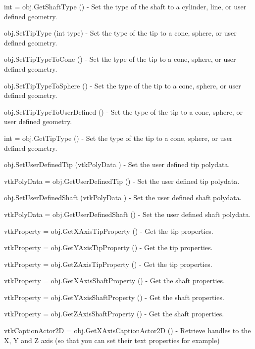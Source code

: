 \begin{DoxyItemize}
\item {\ttfamily int = obj.\-Get\-Shaft\-Type ()} -\/ Set the type of the shaft to a cylinder, line, or user defined geometry.  
\item {\ttfamily obj.\-Set\-Tip\-Type (int type)} -\/ Set the type of the tip to a cone, sphere, or user defined geometry.  
\item {\ttfamily obj.\-Set\-Tip\-Type\-To\-Cone ()} -\/ Set the type of the tip to a cone, sphere, or user defined geometry.  
\item {\ttfamily obj.\-Set\-Tip\-Type\-To\-Sphere ()} -\/ Set the type of the tip to a cone, sphere, or user defined geometry.  
\item {\ttfamily obj.\-Set\-Tip\-Type\-To\-User\-Defined ()} -\/ Set the type of the tip to a cone, sphere, or user defined geometry.  
\item {\ttfamily int = obj.\-Get\-Tip\-Type ()} -\/ Set the type of the tip to a cone, sphere, or user defined geometry.  
\item {\ttfamily obj.\-Set\-User\-Defined\-Tip (vtk\-Poly\-Data )} -\/ Set the user defined tip polydata.  
\item {\ttfamily vtk\-Poly\-Data = obj.\-Get\-User\-Defined\-Tip ()} -\/ Set the user defined tip polydata.  
\item {\ttfamily obj.\-Set\-User\-Defined\-Shaft (vtk\-Poly\-Data )} -\/ Set the user defined shaft polydata.  
\item {\ttfamily vtk\-Poly\-Data = obj.\-Get\-User\-Defined\-Shaft ()} -\/ Set the user defined shaft polydata.  
\item {\ttfamily vtk\-Property = obj.\-Get\-X\-Axis\-Tip\-Property ()} -\/ Get the tip properties.  
\item {\ttfamily vtk\-Property = obj.\-Get\-Y\-Axis\-Tip\-Property ()} -\/ Get the tip properties.  
\item {\ttfamily vtk\-Property = obj.\-Get\-Z\-Axis\-Tip\-Property ()} -\/ Get the tip properties.  
\item {\ttfamily vtk\-Property = obj.\-Get\-X\-Axis\-Shaft\-Property ()} -\/ Get the shaft properties.  
\item {\ttfamily vtk\-Property = obj.\-Get\-Y\-Axis\-Shaft\-Property ()} -\/ Get the shaft properties.  
\item {\ttfamily vtk\-Property = obj.\-Get\-Z\-Axis\-Shaft\-Property ()} -\/ Get the shaft properties.  
\item {\ttfamily vtk\-Caption\-Actor2\-D = obj.\-Get\-X\-Axis\-Caption\-Actor2\-D ()} -\/ Retrieve handles to the X, Y and Z axis (so that you can set their text properties for example)  

\end{DoxyItemize}
